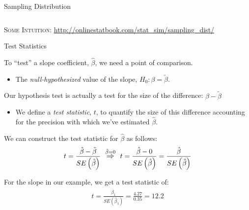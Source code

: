 \documentclass[10pt]{beamer}\usepackage[]{graphicx}\usepackage[]{color}
\newenvironment{knitrout}{}{} %
\begin{document}
\begin{frame}[shrink = 5]{Sampling Distribution}
\begin{columns}
\begin{column}{0.5\textwidth}
\begin{knitrout}
{}


\end{knitrout}

\end{column}
\end{columns}

\textsc{Some Intuition}: \url{http://onlinestatbook.com/stat_sim/sampling_dist/}

\end{frame}

\watermarkon %

\begin{frame}{Test Statistics}
 
  To ``test'' a slope coefficient, $\hat{\beta}$, we need a point of comparison.
  \begin{itemize}
  \item The \emph{null-hypothesized} value of the slope, 
    $H_0: \beta = \tilde{\beta}$.
  \end{itemize}
  
  \vb
  
  Our hypothesis test is actually a test for the size of the difference:
  $\hat{\beta} - \tilde{\beta}$
  \begin{itemize}
  \item We define a \emph{test statistic}, $t$, to quantify the size of this 
    difference accounting for the precision with which we've estimated 
    $\hat{\beta}$.
  \end{itemize}
  
  \vb
  
  We can construct the test statistic for $\hat{\beta}$ as follows:
  \begin{align*}
    t = \frac{\hat{\beta} - \tilde{\beta}}{SE\left(\hat{\beta}\right)} 
    ~~\overset{\tilde{\beta} = 0}{\mathlarger{\Rightarrow}}~~
    t = \frac{\hat{\beta} - 0}{SE\left(\hat{\beta}\right)} = 
    \frac{\hat{\beta}}{SE\left(\hat{\beta}\right)}
  \end{align*}
  


For the slope in our example, we get a test statistic of:
\begin{align*}
  t = \frac{\hat{\beta}_1}{SE\left(\hat{\beta}_1\right)} = 
    \frac{4.27}{0.35} = 12.2
\end{align*}

\end{frame}

\watermarkoff %
\end{document}
